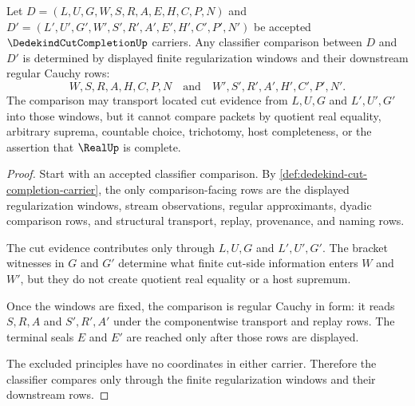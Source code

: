 \begin{theorem}
\label{thm:dedekind-cut-completion-cauchy-comparison}
Let $D=(L,U,G,W,S,R,A,E,H,C,P,N)$ and $D'=(L',U',G',W',S',R',A',E',H',C',P',N')$ be accepted $\DedekindCutCompletionUp$ carriers. Any classifier comparison between $D$ and $D'$ is determined by displayed finite regularization windows and their downstream regular Cauchy rows:
$$
W,S,R,A,H,C,P,N
\quad\text{and}\quad
W',S',R',A',H',C',P',N' .
$$
The comparison may transport located cut evidence from $L,U,G$ and $L',U',G'$ into those windows, but it cannot compare packets by quotient real equality, arbitrary suprema, countable choice, trichotomy, host completeness, or the assertion that $\RealUp$ is complete.
\end{theorem}
\begin{proof}
Start with an accepted classifier comparison. By \autoref{def:dedekind-cut-completion-carrier}, the only comparison-facing rows are the displayed regularization windows, stream observations, regular approximants, dyadic comparison rows, and structural transport, replay, provenance, and naming rows.

The cut evidence contributes only through $L,U,G$ and $L',U',G'$. The bracket witnesses in $G$ and $G'$ determine what finite cut-side information enters $W$ and $W'$, but they do not create quotient real equality or a host supremum.

Once the windows are fixed, the comparison is regular Cauchy in form: it reads $S,R,A$ and $S',R',A'$ under the componentwise transport and replay rows. The terminal seals $E$ and $E'$ are reached only after those rows are displayed.

The excluded principles have no coordinates in either carrier. Therefore the classifier compares only through the finite regularization windows and their downstream rows.
\end{proof}

